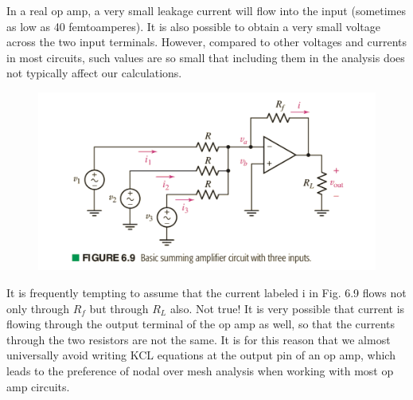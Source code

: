 \documentclass[12pt]{article}
\begin{document}
In a real op amp, a very small leakage current will flow into the input (sometimes as low as 40 femtoamperes). It is also possible to obtain a very small voltage across the two input terminals. However, compared to other voltages and currents in most circuits, such values are so small that including them in the analysis does not typically affect our calculations.


\pagebreak
\setlength{\voffset}{0.15in}


\begin{figure}[htbp]
  \centering
  \includegraphics[scale=0.4]{warning}
\end{figure}
It is frequently tempting to assume that the current labeled i in Fig. 6.9 flows not only through $R_f$ but through $R_L$ also. Not true! It is very possible that current is flowing through the output terminal of the op amp as well, so that the currents through the two resistors are not the same. It is for this reason that we almost universally avoid writing KCL equations at the output pin of an op amp, which leads to the preference of nodal over mesh analysis when working with most op amp circuits.
\end{document}
